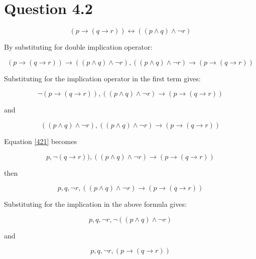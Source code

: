 \documentclass[10pt,a4paper]{article}
\begin{document}
\section{Question 4.2}

\begin{equation}
\label{420}
(p \rightarrow ( q \rightarrow r )) \leftrightarrow (( p \wedge q) \wedge \neg r) 
\end{equation}

By substituting for double implication operator:

\begin{equation}
 (p \rightarrow ( q \rightarrow r )) \rightarrow (( p \wedge q) \wedge \neg r), (( p \wedge q) \wedge \neg r) \rightarrow (p \rightarrow ( q \rightarrow r )) 
\end{equation}

Substituting for the implication operator in the first term gives:

\begin{equation}
\label{421}
 \neg(p \rightarrow ( q \rightarrow r )),  (( p \wedge q) \wedge \neg r) \rightarrow (p \rightarrow ( q \rightarrow r )) 
\end{equation}

and

\begin{equation}
\label{422}
 ((p \wedge q) \wedge \neg r ),  (( p \wedge q) \wedge \neg r) \rightarrow (p \rightarrow ( q \rightarrow r )) 
\end{equation}

Equation \ref{421} becomes

\begin{equation}
p, \neg ( q \rightarrow r )),  (( p \wedge q) \wedge \neg r) \rightarrow (p \rightarrow ( q \rightarrow r )) 
\end{equation}

then 

\begin{equation}
\label{421a}
p, q, \neg r, (( p \wedge q) \wedge \neg r) \rightarrow (p \rightarrow ( q \rightarrow r )) 
\end{equation}

Substituting for the implication in the above formula gives:

\begin{equation}
\label{4211}
p, q, \neg r, \neg (( p \wedge q) \wedge \neg r)
\end{equation}

and

\begin{equation}
\label{4212}
p, q, \neg r, (p \rightarrow ( q \rightarrow r )) 
\end{equation}
\end{document}
